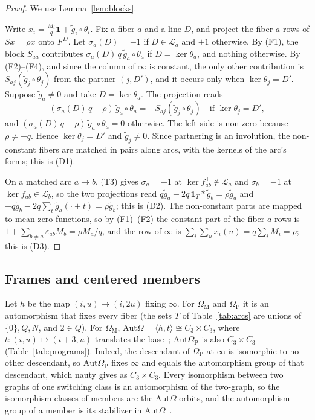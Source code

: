 \documentclass[11pt]{amsart}
\theoremstyle{definition}
\theoremstyle{remark}
\newcommand{\Aut}{\mathrm{Aut}}
\newcommand{\one}{\mathbf 1}
\newcommand{\OM}{\Omega_{\mathrm M}}   %
\newcommand{\OP}{\Omega_{\mathrm P}}   %
\begin{document}
\begin{proof}
We use Lemma~\ref{lem:blocks}.

Write $x_i=\frac{M_i}{q}\one+\tilde g_i\circ\theta_i$. Fix a fiber $a$ and a line $D$, and project the fiber-$a$ rows of
$Sx=\rho x$ onto $F^D$. Let $\sigma_a(D)=-1$ if $D\in\mathcal L_a$ and $+1$ otherwise. By (F1), the block $S_{aa}$
contributes $\sigma_a(D)\,q\,\tilde g_a\circ\theta_a$ if $D=\ker\theta_a$, and nothing otherwise. By (F2)--(F4), and since the column of $\infty$ is constant, the
only other contribution is $S_{aj}(\tilde g_j\circ\theta_j)$ from the partner $(j,D')$, and it occurs only when
$\ker\theta_j=D'$. Suppose $\tilde g_a\ne0$ and take $D=\ker\theta_a$. The projection reads
\[(\sigma_a(D)\,q-\rho)\,\tilde g_a\circ\theta_a=-S_{aj}(\tilde g_j\circ\theta_j)\quad\text{if }\ker\theta_j=D',\]
and $(\sigma_a(D)\,q-\rho)\,\tilde g_a\circ\theta_a=0$ otherwise. The left side is non-zero because $\rho\ne\pm q$.
Hence $\ker\theta_j=D'$ and $\tilde g_j\ne0$. Since partnering is an involution, the non-constant fibers are matched in
pairs along arcs, with the kernels of the arc's forms; this is (D1).

On a matched arc $a\to b$, (T3) gives $\sigma_a=+1$ at $\ker f^+_{ab}\notin\mathcal L_a$ and $\sigma_b=-1$ at
$\ker f^-_{ab}\in\mathcal L_b$, so the two projections read $q\tilde g_a-2q\,\one_T*\tilde g_b=\rho\tilde g_a$ and
$-q\tilde g_b-2q\sum_t\tilde g_a(\cdot+t)=\rho\tilde g_b$; this is (D2). The non-constant parts are mapped to mean-zero
functions, so by (F1)--(F2) the constant part of the fiber-$a$ rows is $1+\sum_{b\ne a}\varepsilon_{ab}M_b=\rho M_a/q$,
and the row of $\infty$ is $\sum_i\sum_ux_i(u)=q\sum_iM_i=\rho$; this is (D3).
\end{proof}

\subsection{Frames and centered members}
Let $h$ be the map $(i,u)\mapsto(i,2u)$ fixing $\infty$. For $\OM$ and $\OP$ it is an automorphism that fixes every
fiber (the sets $T$ of Table~\ref{tab:arcs} are unions of $\{0\},Q,N$, and $2\in Q$). For $\OM$,
$\Aut\Omega=\langle h,t\rangle\cong C_3\times C_3$, where $t\colon(i,u)\mapsto(i+3,u)$ translates the base~\cite[Proposition~2.3]{Plummer442};
$\Aut\OP$ is also $C_3\times C_3$ (Table~\ref{tab:programs}). Indeed, the descendant of $\OP$ at $\infty$ is isomorphic to
no other descendant, so $\Aut\OP$ fixes $\infty$ and equals the automorphism group of that descendant, which nauty
gives as $C_3\times C_3$. Every isomorphism between two graphs of one switching class
is an automorphism of the two-graph, so the isomorphism classes of members are the $\Aut\Omega$-orbits, and the
automorphism group of a member is its stabilizer in $\Aut\Omega$~\cite[Lemma~2.4]{Plummer442}.
\end{document}

